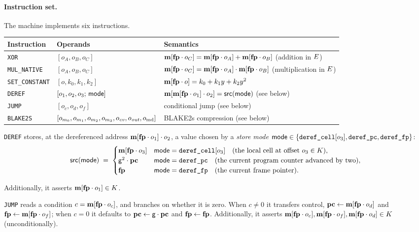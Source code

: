 \paragraph{Instruction set.} The machine implements six instructions.
\begin{center}
\begin{tabularx}{\textwidth}{@{}llX@{}}
\hline
Instruction & Operands & Semantics\\
\hline
\texttt{XOR}           & $[o_A,o_B,o_C]$ & $\mathbf{m}[\mathbf{fp}\cdot o_C]=\mathbf{m}[\mathbf{fp}\cdot o_A]+\mathbf{m}[\mathbf{fp}\cdot o_B]$ \quad(addition in $E$)\\
\texttt{MUL\_NATIVE}   & $[o_A,o_B,o_C]$ & $\mathbf{m}[\mathbf{fp}\cdot o_C]=\mathbf{m}[\mathbf{fp}\cdot o_A]\cdot\mathbf{m}[\mathbf{fp}\cdot o_B]$ (multiplication in $E$)\\
\texttt{SET\_CONSTANT} & $[o,k_0,k_1,k_2]$ & $\mathbf{m}[\mathbf{fp}\cdot o]=k_0+k_1y+k_2y^{2}$\\
\texttt{DEREF}         & $[o_1,o_2,o_3;\,\mathsf{mode}]$ & $\mathbf{m}[\mathbf{m}[\mathbf{fp}\cdot o_1]\cdot o_2]=\mathsf{src}(\mathsf{mode})$ (see below)\\
\texttt{JUMP}          & $[o_c,o_d,o_f]$ & conditional jump (see below)\\
\texttt{BLAKE2S}        & $[o_{m_0},o_{m_1},o_{m_2},o_{m_3},o_{\mathit{cv}},o_{\mathit{out}},o_{\mathrm{md}}]$ & BLAKE2s compression (see below)\\
\hline
\end{tabularx}
\end{center}


\texttt{DEREF} stores, at the dereferenced address $\mathbf{m}[\mathbf{fp}\cdot o_1]\cdot o_2$, a value chosen by a \emph{store mode} $\mathsf{mode}\in\{\texttt{deref\_cell}[o_3],\texttt{deref\_pc},\texttt{deref\_fp}\}$:
\[
  \mathsf{src}(\mathsf{mode})\;=\;
  \begin{cases}
    \mathbf{m}[\mathbf{fp}\cdot o_3] & \mathsf{mode}=\texttt{deref\_cell}[o_3] \quad(\text{the local cell at offset }o_3 \in K),\\
    \mathsf{g}^{2}\cdot\mathbf{pc} & \mathsf{mode}=\texttt{deref\_pc} \quad(\text{the current program counter advanced by two}),\\
    \mathbf{fp} & \mathsf{mode}=\texttt{deref\_fp} \quad(\text{the current frame pointer}).
  \end{cases}
\]

Additionally, it asserts $\mathbf{m}[\mathbf{fp}\cdot o_1] \in K$.

\vspace{5mm}


\texttt{JUMP} reads a condition $c=\mathbf{m}[\mathbf{fp}\cdot o_c]$, and branches on whether it is zero. When $c\neq0$ it transfers control, $\mathbf{pc}\gets\mathbf{m}[\mathbf{fp}\cdot o_d]$ and $\mathbf{fp}\gets\mathbf{m}[\mathbf{fp}\cdot o_f]$; when $c=0$ it defaults to $\mathbf{pc}\gets\mathsf{g}\cdot\mathbf{pc}$ and $\mathbf{fp}\gets\mathbf{fp}$. Additionally, it asserts $\mathbf{m}[\mathbf{fp}\cdot o_c],\mathbf{m}[\mathbf{fp}\cdot o_f], \mathbf{m}[\mathbf{fp}\cdot o_d] \in K$ (unconditionally).

